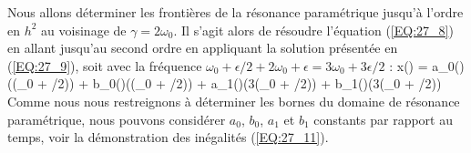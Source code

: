 Nous allons d\'{e}terminer les fronti\`{e}res de la r\'{e}sonance param\'{e}trique jusqu'\`{a} l'ordre en $h^{2}$ au voisinage de $\gamma = 2\omega_{0}$. Il s'agit alors de r\'{e}soudre l'\'{e}quation (\ref{EQ:27_8}) en allant jusqu'au second ordre en appliquant la solution pr\'{e}sent\'{e}e en (\ref{EQ:27_9}), soit avec la fr\'{e}quence $\omega_{0} + \epsilon/2 + 2\omega_{0} + \epsilon = 3\omega_{0} + 3\epsilon/2$ :
\benn
	x() = a_{0}()\cos\left((\omega_{0} + \epsilon/2)\right) + b_{0}()\sin\left((\omega_{0} + \epsilon/2)\right) + a_{1}()\cos\left(3(\omega_{0} + \epsilon/2)\right) + b_{1}()\sin\left(3(\omega_{0} + \epsilon/2)\right)
\eenn
Comme nous nous restreignons \`{a} d\'{e}terminer les bornes du domaine de r\'{e}sonance param\'{e}trique, nous pouvons consid\'{e}rer $a_{0}$, $b_{0}$, $a_{1}$ et $b_{1}$ constants par rapport au temps, voir la d\'{e}monstration des in\'{e}galit\'{e}s (\ref{EQ:27_11}).

